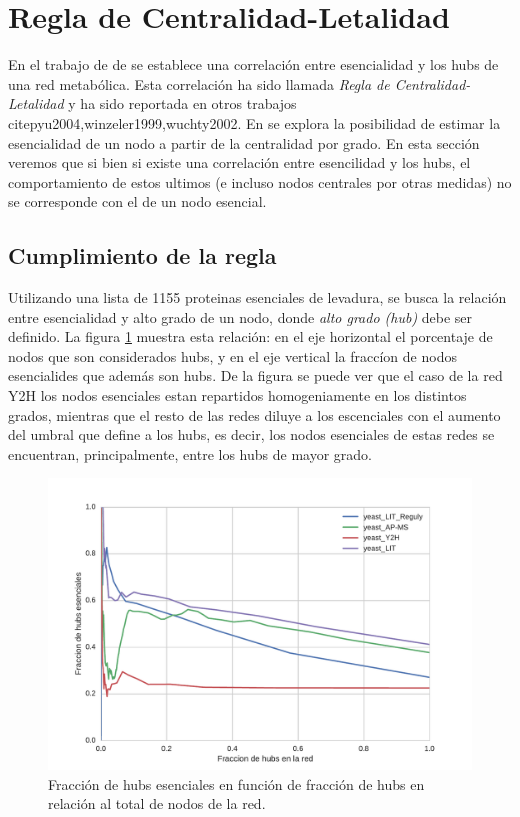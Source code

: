\section{Regla de Centralidad-Letalidad}
En el trabajo de de \citet{jeong2000} se establece una correlaci\'on entre esencialidad y los hubs de una red metab\'olica. 
Esta correlaci\'on ha sido llamada \textit{Regla de Centralidad-Letalidad} y ha sido reportada en otros trabajos 
citep{yu2004,winzeler1999,wuchty2002}. En \citet{jeong2000} se explora la posibilidad de estimar la esencialidad de un
nodo a partir de la centralidad por grado. En esta secci\'on veremos que si bien si existe una correlaci\'on entre esencilidad y los hubs, el comportamiento de estos ultimos (e incluso nodos centrales por otras medidas) no se corresponde con el de un 
nodo esencial.

\subsection{Cumplimiento de la regla}
Utilizando una lista de 1155 proteinas esenciales de levadura, se busca la relaci\'on entre esencialidad y alto grado de un nodo, donde \textit{alto grado (hub)} debe ser definido. La figura \ref{fig:esshub} muestra esta relaci\'on: en el eje horizontal el 
porcentaje de nodos que son considerados hubs, y en el eje vertical la fracc\'ion de nodos esencialides que adem\'as son hubs. 
De la figura se puede ver que el caso de la red Y2H los nodos esenciales estan repartidos homogeniamente en los distintos grados, mientras que el resto de las redes diluye a los escenciales con el aumento del umbral que define a los hubs, es decir, los nodos 
esenciales de estas redes se encuentran, principalmente, entre los hubs de mayor grado.

\begin{figure}[!ht]
    \centering
    \includegraphics[width=.8\columnwidth]{./schemes/ess_hub.pdf}
    \caption{\label{fig:esshub} Fracci\'on de hubs esenciales en funci\'on de fracci\'on de hubs en relaci\'on al total de nodos de la red.  }
\end{figure}


